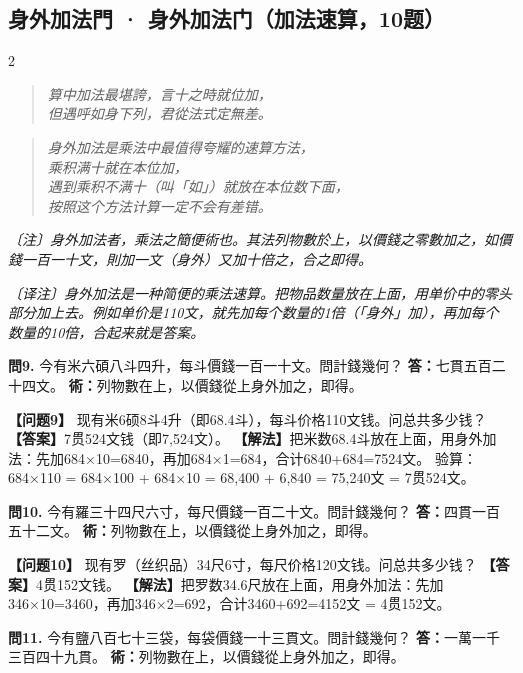 \documentclass[11pt,a4paper]{article}
\newcommand{\rhymeCL}[1]{%
  \begin{quote}\itshape\color{verselinecolor}#1\end{quote}
}
\newcommand{\rhymeMOD}[1]{%
  \begin{quote}\itshape\color{verselinecolor}#1\end{quote}
}
\newcommand{\noteCL}[1]{\par\textcolor{notecolor}{\small\textit{〔注〕#1}}\par\smallskip}
\newcommand{\noteMOD}[1]{\par\textcolor{notecolor}{\small\textit{〔译注〕#1}}\par\smallskip}
\begin{document}
\subsection{身外加法門 · 身外加法门（加法速算，10题）}
\label{sec:shenwaijia}

\begin{paracol}{2}
\rhymeCL{算中加法最堪誇，言十之時就位加，\\
但遇呼如身下列，君從法式定無差。}
\switchcolumn
\rhymeMOD{身外加法是乘法中最值得夸耀的速算方法，\\
乘积满十就在本位加，\\
遇到乘积不满十（叫「如」）就放在本位数下面，\\
按照这个方法计算一定不会有差错。}
\switchcolumn*
\noteCL{身外加法者，乘法之簡便術也。其法列物數於上，以價錢之零數加之，如價錢一百一十文，則加一文（身外）又加十倍之，合之即得。}
\switchcolumn
\noteMOD{身外加法是一种简便的乘法速算。把物品数量放在上面，用单价中的零头部分加上去。例如单价是110文，就先加每个数量的1倍（「身外」加），再加每个数量的10倍，合起来就是答案。}

\switchcolumn*

\textbf{問9.} 今有米六碩八斗四升，每斗價錢一百一十文。問計錢幾何？\break
\textbf{答：}七貫五百二十四文。\break
\textbf{術：}列物數在上，以價錢從上身外加之，即得。

\switchcolumn

\textbf{【问题9】} 现有米6硕8斗4升（即68.4斗），每斗价格110文钱。问总共多少钱？\break
\textbf{【答案】}7贯524文钱（即7,524文）。\break
\textbf{【解法】}把米数68.4斗放在上面，用身外加法：先加684×10=6840，再加684×1=684，合计6840+684=7524文。\break
验算：684×110 = 684×100 + 684×10 = 68,400 + 6,840 = 75,240文 = 7贯524文。

\switchcolumn*

\textbf{問10.} 今有羅三十四尺六寸，每尺價錢一百二十文。問計錢幾何？\break
\textbf{答：}四貫一百五十二文。\break
\textbf{術：}列物數在上，以價錢從上身外加之，即得。

\switchcolumn

\textbf{【问题10】} 现有罗（丝织品）34尺6寸，每尺价格120文钱。问总共多少钱？\break
\textbf{【答案】}4贯152文钱。\break
\textbf{【解法】}把罗数34.6尺放在上面，用身外加法：先加346×10=3460，再加346×2=692，合计3460+692=4152文 = 4贯152文。

\switchcolumn*

\textbf{問11.} 今有鹽八百七十三袋，每袋價錢一十三貫文。問計錢幾何？\break
\textbf{答：}一萬一千三百四十九貫。\break
\textbf{術：}列物數在上，以價錢從上身外加之，即得。


\end{paracol}
\end{document}
